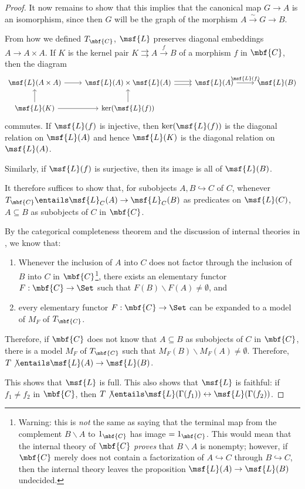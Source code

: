 \documentclass[11pt]{article}
\begin{document}
\begin{proof}
    It now remains to show that this implies that the canonical map $G \to A$ is an isomorphism, since then $G$ will be the graph of the morphism $A \overset{\sim}{\to} G \to B$.

    From how we defined $T_{\mbf{C}}$, $\msf{L}$ preserves diagonal embeddings $A \to A \times A$. If $K$ is the kernel pair $K \rightrightarrows A \overset{f}{\to} B$ of a morphism $f$ in $\mbf{C}$, then the diagram
    $$
    \begin{tikzcd}[ampersand replacement = \&]
     \msf{L}(A \times A) \arrow{r} \& \msf{L}(A) \times \msf{L}(A) \arrow[shift left = 0.50ex]{r} \arrow[shift right = 0.50ex]{r} \& \msf{L}(A) \arrow{r}{\msf{L}(f)} \& \msf{L}(B)\\
\msf{L}(K) \arrow{u}  \arrow{r}     \& \ker(\msf{L}(f))  \arrow{u} \& \&
    \end{tikzcd}
    $$
    commutes. If $\msf{L}(f)$ is injective, then $\ker(\msf{L}(f))$ is the diagonal relation on $\msf{L}(A)$ and hence $\msf{L}(K)$ is the diagonal relation on $\msf{L}(A)$.

    Similarly, if $\msf{L}(f)$ is surjective, then its image is all of $\msf{L}(B)$.

    It therefore suffices to show that, for subobjects $A, B \hookrightarrow C$ of $C$,  whenever $T_{\mbf{C}} \entails \msf{L}_C(A) \rightarrow \msf{L}_C(B)$ as predicates on $\msf{L}(C)$, $A \subseteq B$ as subobjects of $C$ in $\mbf{C}$.

    By the categorical completeness theorem and the discussion of internal theories in \cite{makkai-reyes}, we know that:
    \begin{enumerate}
    \item Whenever the inclusion of $A$ into $C$ does not factor through the inclusion of $B$ into $C$ in $\mbf{C}$\footnote{Warning: this is \emph{not} the same as saying that the terminal map from the complement $B \backslash A$ to $1_{\mbf{C}}$ has image $= 1_{\mbf{C}}$. This would mean that the internal theory of $\mbf{C}$ \emph{proves} that $B \backslash A$ is nonempty; however, if $\mbf{C}$ merely does not contain a factorization of $A \hookrightarrow C$ through $B \hookrightarrow C$, then the internal theory leaves the proposition $\msf{L}(A) \rightarrow \msf{L}(B)$ undecided.}, there exists an elementary functor $F : \mbf{C} \to \Set$ such that $F(B) \backslash F(A) \neq \emptyset$, and
    \item every elementary functor $F : \mbf{C} \to \Set$ can be expanded to a model of $M_F$ of $T_{\mbf{C}}$.
\end{enumerate}
Therefore, if $\mbf{C}$ does not know that $A \subseteq B$ as subobjects of $C$ in $\mbf{C}$, there is a model $M_F$ of $T_{\mbf{C}}$ such that $M_F(B) \backslash M_F(A) \neq \emptyset$. Therefore, $T \not \entails \msf{L}(A) \rightarrow \msf{L}(B)$.

This shows that $\msf{L}$ is full. This also shows that $\msf{L}$ is faithful: if $f_1 \neq f_2$ in $\mbf{C}$, then $T \not \entails \msf{L}(\Gamma(f_1)) \leftrightarrow \msf{L}(\Gamma(f_2))$.
      \end{proof}
  
\end{document}
